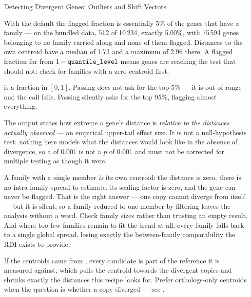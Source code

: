 \begin{recipe}[label=rec:outlier-detection]{Detecting Divergent Genes: Outliers and Shift Vectors}
\begin{expectedresults}
  With the default  the flagged fraction is essentially
  5\% of the genes that have a family --- on the bundled data, 512 of 10\,234,
  exactly 5.00\%, with 75\,594 genes belonging to no family carried along and
  none of them flagged. Distances to the own centroid have a median of 1.73 and
  a maximum of 2.96 there. A flagged fraction far from
  $1-\texttt{quantile\_level}$ means genes are reaching the test that should not:
  check for families with a zero centroid first.
\end{expectedresults}

\begin{pitfall}
   is a fraction in $[0,1]$. Passing  does not ask
  for the top 5\% --- it is out of range and the call fails. Passing
   silently asks for the top 95\%, flagging almost everything.
\end{pitfall}

\begin{pitfall}
  The  output states how extreme a gene's distance is
  \emph{relative to the distances actually observed} --- an empirical
  upper-tail effect size. It is not a null-hypothesis test: nothing here models
  what the distances would look like in the absence of divergence, so a
   of 0.001 is not a $p$ of 0.001 and must not be corrected for
  multiple testing as though it were.
\end{pitfall}

\begin{pitfall}
  A family with a single member \emph{is} its own centroid: the distance is
  zero, there is no intra-family spread to estimate, its scaling factor is
  zero, and the gene can never be flagged. That is the right answer --- one
  copy cannot diverge from itself --- but it is silent, so a family reduced to
  one member by filtering leaves the analysis without a word. Check family
  sizes rather than trusting an empty result. And where too few families remain
  to fit the trend at all, every family falls back to a single global spread,
  losing exactly the between-family comparability the RDI exists to provide.
\end{pitfall}

\begin{pitfall}
  If the centroids came from , every candidate is
  part of the reference it is measured against, which pulls the centroid
  towards the divergent copies and shrinks exactly the distances this recipe
  looks for. Prefer orthologs-only centroids when the question is whether a
  copy diverged --- see .
\end{pitfall}


\end{recipe}
